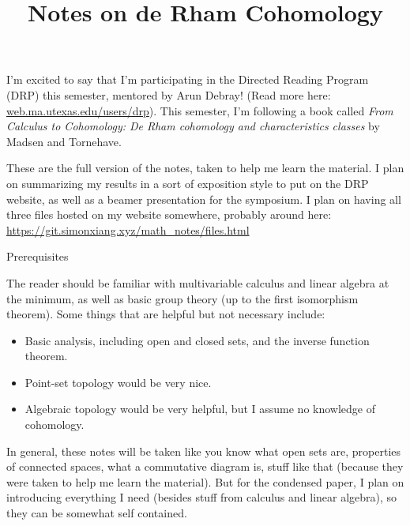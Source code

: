 \documentclass[fontsize=9pt]{article}
\title{Notes on de Rham Cohomology}
\begin{document}
\maketitle
I'm excited to say that I'm participating in the Directed Reading Program (DRP) this semester, mentored by Arun Debray! (Read more here: \url{web.ma.utexas.edu/users/drp}). This semester, I'm following a book called \emph{From Calculus to Cohomology: De Rham cohomology and characteristics classes} by Madsen and Tornehave. 

These are the full version of the notes, taken to help me learn the material. I plan on summarizing my results in a sort of exposition style to put on the DRP website, as well as a beamer presentation for the symposium. I plan on having all three files hosted on my website somewhere, probably around here: \url{https://git.simonxiang.xyz/math_notes/files.html}

\begin{center}
    \large\sc Prerequisites
\end{center}
The reader should be familiar with multivariable calculus and linear algebra at the minimum, as well as basic group theory (up to the first isomorphism theorem). Some things that are helpful but not necessary include:
\begin{itemize}
    \setlength\itemsep{-0.2em}
    \item Basic analysis, including open and closed sets, and the inverse function theorem.
    \item Point-set topology would be very nice.
    \item Algebraic topology would be very helpful, but I assume no knowledge of cohomology. 
\end{itemize}
In general, these notes will be taken like you know what open sets are, properties of connected spaces, what a commutative diagram is, stuff like that (because they were taken to help me learn the material). But for the condensed paper, I plan on introducing everything I need (besides stuff from calculus and linear algebra), so they can be somewhat self contained.
\tableofcontents
    
    
    
    
\end{document}
